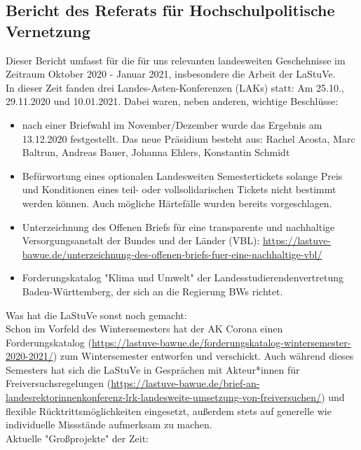\subsection{Bericht des Referats für Hochschulpolitische Vernetzung}
Dieser Bericht umfasst für die für uns relevanten landesweiten Geschehnisse im Zeitraum Oktober 2020 - Januar 2021, insbesondere die Arbeit der LaStuVe.\\
In dieser Zeit fanden drei Landes-Asten-Konferenzen (LAKs) statt: Am 25.10., 29.11.2020 und 10.01.2021. Dabei waren, neben anderen, wichtige Beschlüsse:
\begin{itemize}
    \item nach einer Briefwahl im November/Dezember wurde das Ergebnis am 13.12.2020 festgestellt. Das neue Präsidium besteht aus: Rachel Acosta, Marc Baltrun, Andreas Bauer, Johanna Ehlers, Konstantin Schmidt
    \item Befürwortung eines optionalen Landesweiten Semestertickets solange Preis und Konditionen eines teil- oder vollsolidarischen Tickets nicht bestimmt werden können. Auch mögliche Härtefälle wurden bereits vorgeschlagen.
    \item Unterzeichnung des Offenen Briefs für eine transparente und nachhaltige Versorgungsanstalt der Bundes und der Länder (VBL): \href{https://lastuve-bawue.de/unterzeichnung-des-offenen-briefs-fuer-eine-nachhaltige-vbl/}{https://lastuve-bawue.de/unterzeichnung-des-offenen-briefs-fuer-eine-nachhaltige-vbl/}
    \item Forderungskatalog "Klima und Umwelt" der Landesstudierendenvertretung Baden-Württemberg, der sich an die Regierung BWs richtet.
\end{itemize}
Was hat die LaStuVe sonst noch gemacht:\\
Schon im Vorfeld des Wintersemesters hat der AK Corona einen Forderungskatalog (\href{https://lastuve-bawue.de/forderungskatalog-wintersemester-2020-2021/}{https://lastuve-bawue.de/forderungskatalog-wintersemester-2020-2021/}) zum Wintersemester entworfen und verschickt. Auch während dieses Semesters hat sich die LaStuVe in Gesprächen mit Akteur*innen für Freiversuchsregelungen (\href{https://lastuve-bawue.de/brief-an-landesrektorinnenkonferenz-lrk-landesweite-umsetzung-von-freiversuchen/}{https://lastuve-bawue.de/brief-an-landesrektorinnenkonferenz-lrk-landesweite-umsetzung-von-freiversuchen/}) und flexible Rücktrittsmöglichkeiten eingesetzt, außerdem stets auf generelle wie individuelle Missstände aufmerksam zu machen.\\
Aktuelle "Großprojekte" der Zeit:
